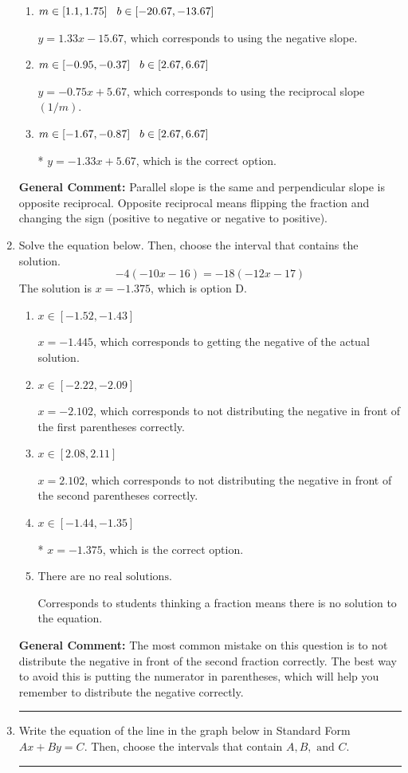 \documentclass{extbook}[14pt]
\newcommand{\litem}[1]{\item #1

\rule{\textwidth}{0.4pt}}
\begin{document}
\begin{enumerate}
{\begin{enumerate}[label=\Alph*.]
 $y = -1.33x - 5.67$, which corresponds to using the correct slope and getting the negative $y$-intercept.
\item \( m \in [1.1, 1.75] \hspace*{3mm} b \in [-20.67, -13.67] \)

 $y = 1.33x - 15.67$, which corresponds to using the negative slope.
\item \( m \in [-0.95, -0.37] \hspace*{3mm} b \in [2.67, 6.67] \)

 $y = -0.75x + 5.67$, which corresponds to using the reciprocal slope $(1/m)$.
\item \( m \in [-1.67, -0.87] \hspace*{3mm} b \in [2.67, 6.67] \)

* $y = -1.33x + 5.67$, which is the correct option.
\end{enumerate}

\textbf{General Comment:} Parallel slope is the same and perpendicular slope is opposite reciprocal. Opposite reciprocal means flipping the fraction and changing the sign (positive to negative or negative to positive).
}
\litem{
Solve the equation below. Then, choose the interval that contains the solution.
\[ -4(-10x -16) = -18(-12x -17) \]The solution is \( x = -1.375 \), which is option D.\begin{enumerate}[label=\Alph*.]
\item \( x \in [-1.52, -1.43] \)

$x = -1.445$, which corresponds to getting the negative of the actual solution.
\item \( x \in [-2.22, -2.09] \)

$x = -2.102$, which corresponds to not distributing the negative in front of the first parentheses correctly.
\item \( x \in [2.08, 2.11] \)

$x = 2.102$, which corresponds to not distributing the negative in front of the second parentheses correctly.
\item \( x \in [-1.44, -1.35] \)

* $x = -1.375$, which is the correct option.
\item \( \text{There are no real solutions.} \)

Corresponds to students thinking a fraction means there is no solution to the equation.
\end{enumerate}

\textbf{General Comment:} The most common mistake on this question is to not distribute the negative in front of the second fraction correctly. The best way to avoid this is putting the numerator in parentheses, which will help you remember to distribute the negative correctly.
}
\litem{
Write the equation of the line in the graph below in Standard Form $Ax+By=C$. Then, choose the intervals that contain $A, B, \text{ and } C$.

}
\end{enumerate}
\end{document}
